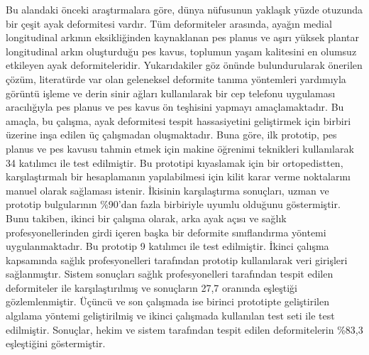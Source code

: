 \begin{turkishabstract}\label{chp:turkishabstract}

Bu alandaki önceki araştırmalara göre, dünya nüfusunun yaklaşık yüzde otuzunda bir çeşit ayak deformitesi vardır. Tüm deformiteler arasında, ayağın medial longitudinal arkının eksikliğinden kaynaklanan pes planus ve aşırı yüksek plantar longitudinal arkın oluşturduğu pes kavus, toplumun yaşam kalitesini en olumsuz etkileyen ayak deformiteleridir. Yukarıdakiler göz önünde bulundurularak önerilen çözüm, literatürde var olan geleneksel deformite tanıma yöntemleri yardımıyla görüntü işleme ve derin sinir ağları kullanılarak bir cep telefonu uygulaması aracılığıyla pes planus ve pes kavus ön teşhisini yapmayı amaçlamaktadır. Bu amaçla, bu çalışma, ayak deformitesi tespit hassasiyetini geliştirmek için birbiri üzerine inşa edilen üç çalışmadan oluşmaktadır. Buna göre, ilk prototip, pes planus ve pes kavusu tahmin etmek için makine öğrenimi teknikleri kullanılarak 34 katılımcı ile test edilmiştir. Bu prototipi kıyaslamak için bir ortopedistten, karşılaştırmalı bir hesaplamanın yapılabilmesi için kilit karar verme noktalarını manuel olarak sağlaması istenir. İkisinin karşılaştırma sonuçları, uzman ve prototip bulgularının \%90'dan fazla birbiriyle uyumlu olduğunu göstermiştir. Bunu takiben, ikinci bir çalışma olarak, arka ayak açısı ve sağlık profesyonellerinden girdi içeren başka bir deformite sınıflandırma yöntemi uygulanmaktadır. Bu prototip 9 katılımcı ile test edilmiştir. İkinci çalışma kapsamında sağlık profesyonelleri tarafından prototip kullanılarak veri girişleri sağlanmıştır. Sistem sonuçları sağlık profesyonelleri tarafından tespit edilen deformiteler ile karşılaştırılmış ve sonuçların 27,7 oranında eşleştiği gözlemlenmiştir. Üçüncü ve son çalışmada ise birinci prototipte geliştirilen algılama yöntemi geliştirilmiş ve ikinci çalışmada kullanılan test seti ile test edilmiştir. Sonuçlar, hekim ve sistem tarafından tespit edilen deformitelerin \%83,3 eşleştiğini göstermiştir.

\end{turkishabstract}